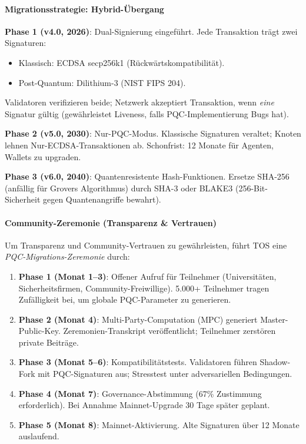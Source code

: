 \documentclass[11pt]{article}
\begin{document}
\paragraph{Migrationsstrategie: Hybrid-Übergang}
\textbf{Phase 1 (v4.0, 2026)}: Dual-Signierung eingeführt. Jede Transaktion trägt zwei Signaturen:
\begin{itemize}[noitemsep]
  \item Klassisch: ECDSA secp256k1 (Rückwärtskompatibilität).
  \item Post-Quantum: Dilithium-3 (NIST FIPS 204).
\end{itemize}
Validatoren verifizieren beide; Netzwerk akzeptiert Transaktion, wenn \emph{eine} Signatur gültig (gewährleistet Liveness, falls PQC-Implementierung Bugs hat).

\textbf{Phase 2 (v5.0, 2030)}: Nur-PQC-Modus. Klassische Signaturen veraltet; Knoten lehnen Nur-ECDSA-Transaktionen ab. Schonfrist: 12 Monate für Agenten, Wallets zu upgraden.

\textbf{Phase 3 (v6.0, 2040)}: Quantenresistente Hash-Funktionen. Ersetze SHA-256 (anfällig für Grovers Algorithmus) durch SHA-3 oder BLAKE3 (256-Bit-Sicherheit gegen Quantenangriffe bewahrt).

\paragraph{Community-Zeremonie (Transparenz \& Vertrauen)}
Um Transparenz und Community-Vertrauen zu gewährleisten, führt TOS eine \emph{PQC-Migrations-Zeremonie} durch:
\begin{enumerate}[noitemsep]
  \item \textbf{Phase 1 (Monat 1--3)}: Offener Aufruf für Teilnehmer (Universitäten, Sicherheitsfirmen, Community-Freiwillige). 5.000+ Teilnehmer tragen Zufälligkeit bei, um globale PQC-Parameter zu generieren.
  \item \textbf{Phase 2 (Monat 4)}: Multi-Party-Computation (MPC) generiert Master-Public-Key. Zeremonien-Transkript veröffentlicht; Teilnehmer zerstören private Beiträge.
  \item \textbf{Phase 3 (Monat 5--6)}: Kompatibilitätstests. Validatoren führen Shadow-Fork mit PQC-Signaturen aus; Stresstest unter adversariellen Bedingungen.
  \item \textbf{Phase 4 (Monat 7)}: Governance-Abstimmung (67\% Zustimmung erforderlich). Bei Annahme Mainnet-Upgrade 30 Tage später geplant.
  \item \textbf{Phase 5 (Monat 8)}: Mainnet-Aktivierung. Alte Signaturen über 12 Monate auslaufend.
\end{enumerate}
\end{document}
